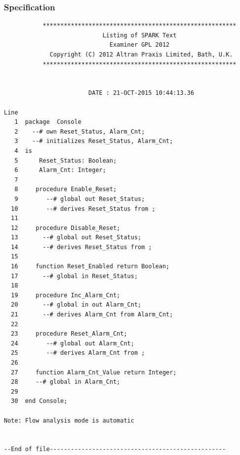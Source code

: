 \documentclass[a4paper, titlepage]{article}
\begin{document}
\subsubsection{Specification}
{\tiny
\begin{lstlisting}
           *******************************************************
                            Listing of SPARK Text
                              Examiner GPL 2012
             Copyright (C) 2012 Altran Praxis Limited, Bath, U.K.
           *******************************************************


                        DATE : 21-OCT-2015 10:44:13.36

Line
   1  package  Console
   2    --# own Reset_Status, Alarm_Cnt;
   3    --# initializes Reset_Status, Alarm_Cnt;
   4  is
   5      Reset_Status: Boolean;
   6      Alarm_Cnt: Integer;
   7     
   8     procedure Enable_Reset;
   9        --# global out Reset_Status;
  10        --# derives Reset_Status from ; 
  11     
  12     procedure Disable_Reset;
  13       --# global out Reset_Status;
  14       --# derives Reset_Status from ;  
  15     
  16     function Reset_Enabled return Boolean;
  17       --# global in Reset_Status;  
  18     
  19     procedure Inc_Alarm_Cnt;
  20       --# global in out Alarm_Cnt;
  21       --# derives Alarm_Cnt from Alarm_Cnt;
  22  
  23     procedure Reset_Alarm_Cnt;
  24        --# global out Alarm_Cnt;
  25        --# derives Alarm_Cnt from ;
  26     
  27     function Alarm_Cnt_Value return Integer;
  28     --# global in Alarm_Cnt;
  29  
  30  end Console;

Note: Flow analysis mode is automatic


--End of file--------------------------------------------------

\end{lstlisting}
}
\end{document}
